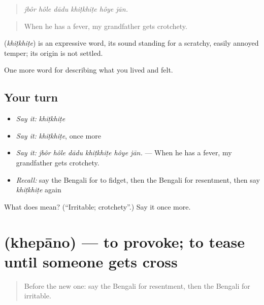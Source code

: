 \begin{quote}
\emph{jbôr hôle dādu khiṭkhiṭe hôye jān.}
\end{quote}

\begin{quote}
When he has a fever, my grandfather gets crotchety.
\end{quote}

\begin{cousinweb}
\textbf{} (\emph{khiṭkhiṭe}) is an expressive word, its sound standing for a scratchy, easily annoyed temper; its origin is not settled.
\end{cousinweb}

\begin{grammarlens}[title={What you've built}]
One more word for describing what you lived and felt.
\end{grammarlens}

\subsection*{Your turn}
\begin{itemize}
\raggedright
  \item \emph{Say it:} \emph{khiṭkhiṭe}
  \item \emph{Say it:} \emph{khiṭkhiṭe}, once more
  \item \emph{Say it:} \emph{jbôr hôle dādu khiṭkhiṭe hôye jān.} — When he has a fever, my grandfather gets crotchety.
  \item \emph{Recall:} say the Bengali for to fidget, then the Bengali for resentment, then say \emph{khiṭkhiṭe} again
\end{itemize}

\begin{tcolorbox}[breakable,colback=teal!4,colframe=teal!35!black,title={Before you move on}]
What does  mean? (\textquotedblleft{}Irritable; crotchety\textquotedblright{}.) Say it once more.
\end{tcolorbox}
\section[\texorpdfstring{\bn{খেপানো} (khepāno)}{খেপানো (khepāno)}]{ (khepāno) — to provoke; to tease until someone gets cross}

\label{lesson:BN-C443-khepano}



\begin{quote}
Before the new one: say the Bengali for resentment, then the Bengali for irritable.
\end{quote}

